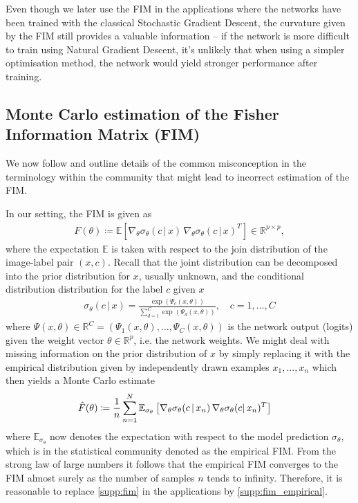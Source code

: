 Even though we later use the FIM in the applications where the networks have been trained with the classical Stochastic Gradient Descent, the curvature given by the FIM still provides a valuable information -- if the network is more difficult to train using Natural Gradient Descent, it's unlikely that when using a simpler optimisation method, the network would yield stronger performance after training.

\subsection{Monte Carlo estimation of the Fisher Information Matrix (FIM)}
\label{subsec:montecarlo}

We now follow \cite{kunstner2019limitations} and outline details of the common misconception in the terminology within the community that might lead to incorrect estimation of the FIM. 

In our setting, the FIM is given as
\begin{align}
\label{supp:fim}
F(\theta)\coloneq\mathbb{E}\left[\nabla_{\theta}\sigma_\theta(c\,|\,x)\,\nabla_{\theta}\sigma_\theta(c\,|\,x)^T\right]\in\mathbb{R}^{p\times p},
\end{align}
where the expectation $\mathbb{E}$ is taken with respect to the join distribution of the image-label pair $(x,c)$. Recall that the joint distribution can be decomposed into the prior distribution for $x$, usually unknown, and the conditional distribution distribution for the label $c$ given $x$
\begin{align}
    \sigma_\theta(c\,|\,x)=\frac{\exp\left({\Psi_c(x, \theta)}\right)}{\sum_{d=1}^C\exp\left({\Psi_d(x, \theta)}\right)}, \quad c=1,\dots, C
\end{align}
where $\Psi(x,\theta)\in\mathbb{R}^C=\left( \Psi_1(x,\theta),\dots ,\Psi_C(x,\theta)\right)$ is the network output (logits) given the weight vector $\theta\in\mathbb{R}^p$, i.e. the network weights. We might deal with missing information on the prior distribution of $x$ by simply replacing it with the empirical distribution given by independently drawn examples $x_1,\dots, x_n$ which then yields a Monte Carlo estimate
\begin{align}
\Hat{F}(\theta)&\coloneq\frac{1}{n}\sum_{n=1}^N\mathbb{E}_{\sigma_\theta}\left[\nabla_{\theta}\sigma_\theta(c\,|\,x_n)\,\nabla_{\theta}\sigma_\theta(c|\,x_n)^T\right]
    \label{supp:fim_empirical}
\end{align}
where $\mathbb{E}_{\sigma_\theta}$ now denotes the expectation with respect to the model prediction $\sigma_\theta$, which is in the statistical community denoted as the empirical FIM. From the strong law of large numbers it follows that the empirical FIM converges to the FIM almost surely as the number of samples $n$ tends to infinity. Therefore, it is reasonable to replace \eqref{supp:fim} in the applications by \eqref{supp:fim_empirical}.

